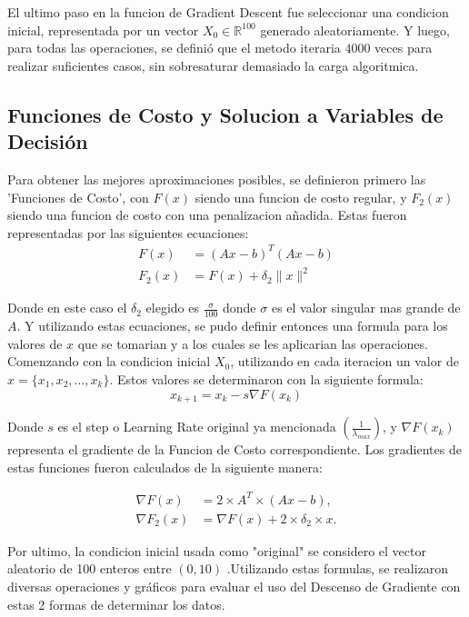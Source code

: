 \documentclass{article}
\begin{document}
\noindent El ultimo paso en la funcion de Gradient Descent fue seleccionar una condicion inicial, representada por un vector $X_0 \in \mathbb{R}^{100}$ generado aleatoriamente. Y luego, para todas las operaciones, se definió que el metodo iteraria $4000$ veces para realizar suficientes casos, sin sobresaturar demasiado la carga algoritmica.
\vspace{\baselineskip}


\subsection*{Funciones de Costo y Solucion a Variables de Decisión}

\noindent Para obtener las mejores aproximaciones posibles, se definieron primero las 'Funciones de Costo', con $F(x)$ siendo una funcion de costo regular, y $F_2(x)$ siendo una funcion de costo con una penalizacion añadida. Estas fueron representadas por las siguientes ecuaciones:
\begin{align}
F(x) &= (Ax - b)^T (Ax - b) \\
F_2(x) &= F(x) + \delta_2 \|x\|^2
\end{align}

\noindent Donde en este caso el $\delta_2$ elegido es $\frac{\sigma}{100}$ donde $\sigma$ es el valor singular mas grande de $A$.
Y utilizando estas ecuaciones, se pudo definir entonces una formula para los valores de $x$ que se tomarian y a los cuales se les aplicarian las operaciones. Comenzando con la condicion inicial $X_0$, utilizando en cada iteracion un valor de $x = \{x_1, x_2, ..., x_k\}$. Estos valores se determinaron con la siguiente formula:
\[
x_{k+1} = x_k - s \nabla F(x_k)
\]

\noindent Donde $s$ es el step o Learning Rate original ya mencionada $\left(\frac{1}{\lambda_{max}}\right)$, y $\nabla F(x_k)$ representa el gradiente de la Funcion de Costo correspondiente. Los gradientes de estas funciones fueron calculados de la siguiente manera:
\vspace{-0.5cm}

\begin{align*}
\nabla F(x) &= 2 \times A^T \times (Ax - b), \\
\nabla F_2(x) &= \nabla F(x) + 2 \times \delta_2 \times x.
\end{align*}

\noindent Por ultimo, la condicion inicial usada como "original" se considero el vector aleatorio de 100 enteros entre $(0, 10)$ .Utilizando estas formulas, se realizaron diversas operaciones y gráficos para evaluar el uso del Descenso de Gradiente con estas 2 formas de determinar los datos. 
\vspace{\baselineskip}
\end{document}
